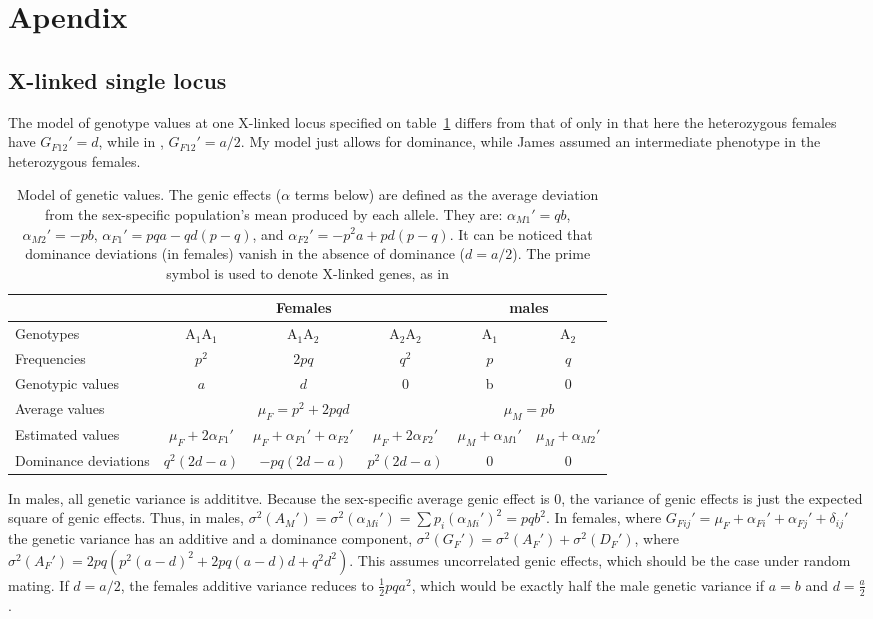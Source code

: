 \documentclass[a4paper,12pt]{article}
\begin{document}
\section{Apendix}
\subsection{X-linked single locus}
The model of genotype values at one X-linked locus specified on table~\ref{tau:values} differs from that of \citet{James1973} only in that here the heterozygous females have $G_{F12}'=d$, while in \citet{James1973}, $G_{F12}' = a/2$. My model just allows for dominance, while James assumed an intermediate phenotype in the heterozygous females.

\begin{table}
\begin{center}
\caption{Model of genetic values. The genic effects ($\alpha$ terms below) are defined as the average deviation from the sex-specific population's mean produced by each allele. They are: $\alpha_{M1}'=qb$, $\alpha_{M2}'=-pb$, $\alpha_{F1}'=pqa - qd(p-q)$, and $\alpha_{F2}'=-p^2a + pd(p-q)$. It can be noticed that dominance deviations (in females) vanish in the absence of dominance ($d=a/2$). The prime symbol is used to denote X-linked genes, as in \cite[chapter 24]{Lynch1998}}\label{tau:values}
\begin{tabular}{lccccc}
\toprule
&\multicolumn{3}{c}{Females}&\multicolumn{2}{c}{males}\\
\midrule
Genotypes&A$_1$A$_1$&A$_1$A$_2$&A$_2$A$_2$&A$_1$&A$_2$\\
Frequencies&$p^2$&$2pq$&$q^2$&$p$&$q$\\
Genotypic values&$a$&$d$&0&b&0\\
\cmidrule(lr){2-4}\cmidrule(lr){5-6}
Average values&\multicolumn{3}{c}{$\mu_F=p^2 + 2pqd$}&\multicolumn{2}{c}{$\mu_M=pb$}\\
\cmidrule(lr){2-4}\cmidrule(lr){5-6}
Estimated values&$\mu_F + 2\alpha_{F1}'$&$\mu_F + \alpha_{F1}' + \alpha_{F2}'$&$\mu_F + 2\alpha_{F2}'$&$\mu_M + \alpha_{M1}'$&$\mu_M + \alpha_{M2}'$\\
Dominance deviations&$q^2(2d - a)$&$-pq(2d-a)$&$p^2(2d-a)$&0&0\\
\bottomrule
\end{tabular}
\end{center}
\end{table}

In males, all genetic variance is addititve. Because the sex-specific average genic effect is 0, the variance of genic effects is just the expected square of genic effects. Thus, in males, $\sigma^2(A_M')=\sigma^2(\alpha_{Mi}')=\sum p_i(\alpha_{Mi}')^2=pqb^2$. In females, where $G_{Fij}'=\mu_F + \alpha_{Fi}' + \alpha_{Fj}' + \delta_{ij}'$ the genetic variance has an additive and a dominance component, $\sigma^2(G_F')=\sigma^2(A_F') + \sigma^2(D_F')$, where $\sigma^2(A_F')=2pq(p^2(a-d)^2 + 2pq(a-d)d + q^2d^2)$. This assumes uncorrelated genic effects, which should be the case under random mating. If $d = a/2$, the females additive variance reduces to $\frac{1}{2}pqa^2$, which would be exactly half the male genetic variance if $a = b$ and $d=\frac{a}{2}$. 
\end{document}

